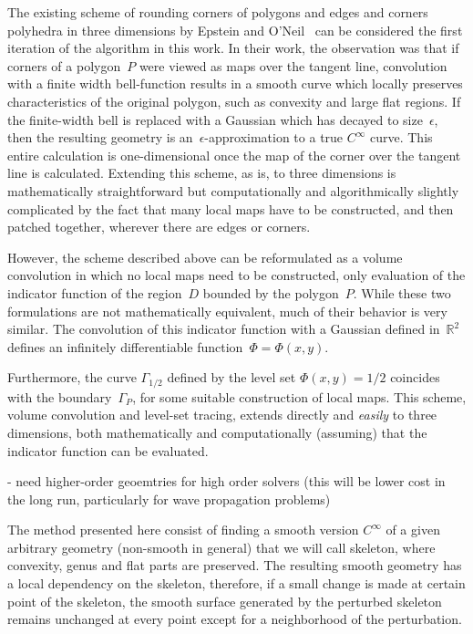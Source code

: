 \documentclass[11pt]{article}
\numberwithin{equation}{section}
\newcommand\bbR{\mathbb R}
\begin{document}
The existing scheme of rounding corners of polygons and edges and
corners polyhedra in three dimensions
by Epstein and O'Neil~\cite{epstein_2016} can be considered the first
iteration of the algorithm in this work. In their work, the
observation was that if corners of a polygon~$P$ were viewed as
maps over the tangent line, convolution with a finite width
bell-function results in a smooth curve which locally preserves
characteristics of the original polygon, such as convexity and large
flat regions. If the finite-width bell is
replaced with a Gaussian which has decayed to
size~$\epsilon$, then the resulting geometry is
an~$\epsilon$-approximation to a true $C^\infty$ curve.
This entire calculation is one-dimensional once the map
of the corner over the tangent line is calculated. Extending this
scheme, as is, to three dimensions is mathematically straightforward
but computationally and algorithmically slightly complicated by the
fact that many local maps have to be constructed, and then patched
together, wherever there are edges or corners.

However, the scheme described above can be reformulated as a volume
convolution in which no local maps need to be constructed, only
evaluation of the indicator function of the region~$D$ bounded
by the polygon~$P$. While these two formulations are not
mathematically equivalent, much of their behavior is very similar.
The convolution of this indicator function
with a Gaussian defined in~$\bbR^2$ defines an infinitely
differentiable function~$\Phi = \Phi(x,y)$.


Furthermore, the curve
$\Gamma_{1/2}$ defined by the level set $\Phi(x,y) = 1/2$ coincides
with the boundary~$\Gamma_P$, for some suitable construction of local
maps. This scheme, volume convolution and level-set tracing, extends
directly and \emph{easily} to three dimensions, both mathematically
and computationally (assuming) that the indicator function can be
evaluated.




- need higher-order geoemtries for high order solvers (this will be
lower cost in the long run, particularly for wave propagation
problems)


The method presented here consist of finding a smooth version
$C^{\infty}$ of a given arbitrary geometry (non-smooth in general)
that we will call skeleton, where convexity, genus and flat parts are
preserved. The resulting smooth geometry has a local dependency on the
skeleton, therefore, if a small change is made at certain point of the
skeleton, the smooth surface generated by the perturbed skeleton
remains unchanged at every point except for a neighborhood of the
perturbation.
\end{document}
